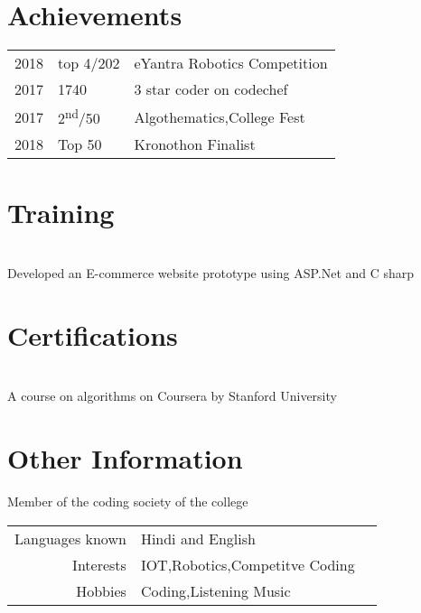 \documentclass[]{resume-openfont}
\begin{document}
\begin{minipage}[t]{0.66\textwidth}

\section{Achievements} 
\begin{tabular}{rll}
2018	     & top 4/202  & eYantra Robotics Competition\\
2017	     & 1740  & 3 star coder on codechef\\
2017	     & 2\textsuperscript{nd}/50  & Algothematics,College Fest\\
2018	     & Top 50  & Kronothon Finalist
\end{tabular}
\sectionsep
\section{Training }

\\
Developed an E-commerce website prototype using ASP.Net and C sharp
\sectionsep
\section{Certifications }
\\
A course on algorithms on Coursera by Stanford University
\sectionsep
\section{Other Information }
Member of the coding society of the college\\
\begin{tabular}{rll}
Languages known & Hindi and English\\
Interests & IOT,Robotics,Competitve Coding\\
Hobbies & Coding,Listening Music
\end{tabular}
\sectionsep
\end{minipage} 
\end{document}
